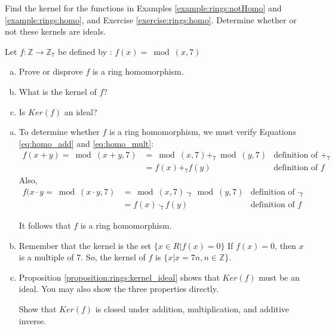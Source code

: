 \begin{exercise}
Find the kernel for the functions in Examples \ref{example:rings:notHomo} and \ref{example:rings:homo}, and Exercise \ref{exercise:rings:homo}.  Determine whether or not these kernels are ideals.
\end{exercise}

\begin{example}\label{example:rings:ZtoZ7}
Let $f:{\mathbb Z}\rightarrow {\mathbb Z}_7$ be defined by : $f(x)=\bmod(x,7)$
\begin{enumerate}[(a)]
\item Prove or disprove $f$ is a ring homomorphism.
\item What is the kernel of $f$?
\item Is $Ker(f)$ an ideal?
\end{enumerate}

\begin{enumerate}[(a)]
\item To determine whether $f$ is a ring homomorphism, we must verify Equations \eqref{eq:homo_add} and \eqref{eq:homo_mult}:\\
\begin{align*}
f(x+y)=\bmod(x+y,7)&=\bmod(x,7)+_7\bmod(y,7) & \text{definition of $+_7$}\\
&=f(x)+_7 f(y) & \text{definition of $f$} 
\end{align*}
Also,
\begin{align*}
f(x\cdot y=\bmod(x\cdot y,7)&=\bmod(x,7)\cdot_7\bmod(y,7) & \text{definition of $\cdot_7$}\\
&=f(x)\cdot_7f(y) & \text{definition of $f$}
\end{align*}

It follows that $f$ is a ring homomorphism.

\item Remember that the kernel is the set $\{x\in R|f(x)=0\}$ If $f(x)=0$, then $x$ is a multiple of 7. So, the kernel of $f$ is $\{x|x=7n, n\in{\mathbb Z}\}$.

\item Proposition \ref{proposition:rings:kernel_ideal} shows that $Ker(f)$ must be an ideal.  You may also show the three properties directly.

\begin{exercise}\label{exercise:rings:kernelClosures}
Show that $Ker(f)$ is closed under addition, multiplication, and additive inverse.
\end{exercise}
\end{enumerate}
\end{example}


